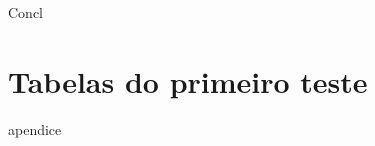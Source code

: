 \documentclass[
    12pt,               %
    openright,          %
    oneside,
    a4paper,            %
    english,            %
    french,             %
    spanish,            %
    brazil              %
    ]{abntex2}
\begin{document}
Concl

\postextual


%

\begin{apendicesenv}
\label{chap:apendices}

\partapendices

\chapter{Tabelas do primeiro teste}
apendice



\end{apendicesenv}
\end{document}
